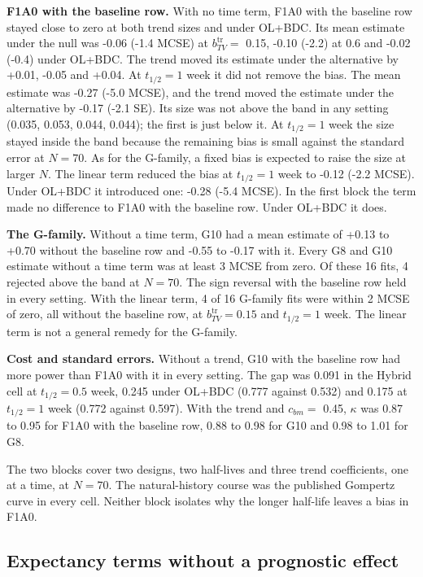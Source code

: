 \documentclass[
  11pt,
]{article}
\begin{document}
\textbf{F1A0 with the baseline row.} With no time term, F1A0 with the
baseline row stayed close to zero at both trend sizes and under
OL+BDC. Its mean estimate under the null was -0.06
(-1.4 MCSE) at \(b_{TV}^{\mathrm{tr}} =\)
0.15, -0.10 (-2.2) at
0.6 and -0.02 (-0.4) under
OL+BDC. The trend moved its estimate under the alternative by
+0.01, -0.05 and +0.04. At
\(t_{1/2} = 1\) week it did not remove the bias. The mean estimate was
-0.27 (-5.0 MCSE), and the trend moved
the estimate under the alternative by -0.17
(-2.1 SE). Its size was not above the band in any
setting (0.035, 0.053, 0.044,
0.044); the first is just below it. At
\(t_{1/2} = 1\) week the size stayed inside the band because the
remaining bias is small against the standard error at \(N = 70\). As for the
G-family, a fixed bias is expected to raise the size at larger \(N\).
The linear term reduced the bias at \(t_{1/2} = 1\) week to
-0.12 (-2.2 MCSE). Under OL+BDC it
introduced one: -0.28 (-5.4 MCSE). In
the first block the term made no difference to F1A0 with the baseline
row. Under OL+BDC it does.

\textbf{The G-family.} Without a time term, G10 had a mean estimate of
+0.13 to +0.70 without the baseline row and -0.55 to -0.17 with it.
Every G8 and G10 estimate without a time term was at least
3 MCSE from zero. Of these 16 fits,
4 rejected above the band at \(N = 70\). The sign
reversal with the baseline row held in every setting. With the
linear term, 4 of 16 G-family fits were
within 2 MCSE of zero, all without the baseline row, at
\(b_{TV}^{\mathrm{tr}} = 0.15\) and \(t_{1/2} = 1\) week. The linear term is not a general remedy for the
G-family.

\textbf{Cost and standard errors.} Without a trend, G10 with the baseline
row had more power than F1A0 with it in every setting. The gap was
0.091 in the Hybrid cell at \(t_{1/2} = 0.5\) week,
0.245 under OL+BDC (0.777 against
0.532) and 0.175 at \(t_{1/2} = 1\) week
(0.772 against 0.597). With the trend
and \(c_{bm} =\) 0.45, \(\kappa\) was 0.87 to 0.95 for F1A0
with the baseline row, 0.88 to 0.98 for G10 and 0.98 to 1.01
for G8.

The two blocks cover two designs, two half-lives and three trend
coefficients, one at a time, at \(N = 70\). The natural-history course
was the published Gompertz curve in every cell. Neither block
isolates why the longer half-life leaves a bias in F1A0.

\subsection{Expectancy terms without a prognostic effect}\label{sec-gvf}
\end{document}
